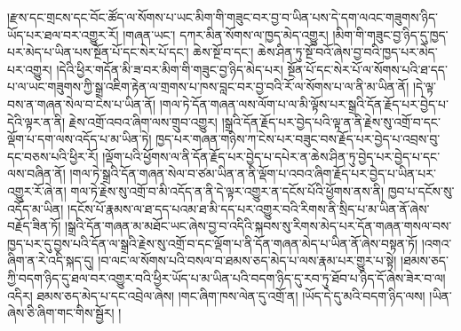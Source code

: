 །རྫས་དང་གྲངས་དང་བོང་ཚོད་ལ་སོགས་པ་ཡང་མིག་གི་གཟུང་བར་བྱ་བ་ཡིན་པས་དེ་དག་ལའང་གཟུགས་ཉིད་ཡོད་པར་ཐལ་བར་འགྱུར་རོ། །གཞན་ཡང་། དཀར་མིན་སོགས་ལ་ཁྱད་མེད་འགྱུར། །མིག་གི་གཟུང་བྱ་ཉིད་དུ་ཁྱད་པར་མེད་པ་ཡིན་པས་སྔོན་པོ་དང་སེར་པོ་དང་། ཆེས་སྔོ་བ་དང་། ཆེས་ཤིན་ཏུ་སྔོ་བའོ་ཞེས་བྱ་བའི་ཁྱད་པར་མེད་པར་འགྱུར། །དེའི་ཕྱིར་གདོན་མི་ཟ་བར་མིག་གི་གཟུང་བྱ་ཉིད་མེད་པར། སྔོན་པོ་དང་སེར་པོ་ལ་སོགས་པའི་ཐ་དད་པ་ལ་ཡང་གཟུགས་ཀྱི་སྒྲ་འཇིག་རྟེན་ལ་གྲགས་པ་ཁས་བླང་བར་བྱ་བའི་རོ་ལ་སོགས་པ་ལ་ནི་མ་ཡིན་ནོ། །དེ་ལྟ་བས་ན་གཞན་སེལ་བ་ངེས་པ་ཡིན་ནོ། །གལ་ཏེ་དོན་གཞན་ལས་ལོག་པ་ལ་མི་ལྟོས་པར་སྒྲའི་དོན་རྗོད་པར་བྱེད་པ་དེའི་ལྟར་ན་ནི། རྗེས་འགྲོ་འབའ་ཞིག་ལས་གྲུབ་འགྱུར། །སྒྲའི་དོན་རྗོད་པར་བྱེད་པའི་ལྟ་ན་ནི་རྗེས་སུ་འགྲོ་བ་དང་ལྡོག་པ་དག་ལས་འདོད་པ་མ་ཡིན་ཏེ། ཁྱད་པར་གཞན་གཉིས་ཀ་ངེས་པར་བཟུང་བས་རྗོད་པར་བྱེད་པ་འབྲས་བུ་དང་བཅས་པའི་ཕྱིར་རོ། །ལྡོག་པའི་ཕྱོགས་ལ་ནི་དོན་རྗོད་པར་བྱེད་པ་དཔེར་ན་ཆེས་ཤིན་ཏུ་བྱེད་པར་བྱེད་པ་དང་ལས་བཞིན་ནོ། །གལ་ཏེ་སྒྲའི་དོན་གཞན་སེལ་བ་ཙམ་ཡིན་ན་ནི་ལྡོག་པ་འབའ་ཞིག་རྗོད་པར་བྱེད་པ་ཡིན་པར་འགྱུར་རོ་ཞེ་ན། གལ་ཏེ་རྗེས་སུ་འགྲོ་བ་མི་འདོད་ན་ནི་དེ་ལྟར་འགྱུར་ན་དངོས་པོའི་ཕྱོགས་ནས་ནི། ཁྱབ་པ་དངོས་སུ་འདོད་མ་ཡིན། །དངོས་པོ་རྣམས་ལ་ཐ་དད་པའམ་ཐ་མི་དད་པར་འགྱུར་བའི་རིགས་ནི་སྲིད་པ་མ་ཡིན་ནོ་ཞེས་བརྗོད་ཟིན་ཏོ། །སྒྲའི་དོན་གཞན་མ་མཐོང་ཡང་ཞེས་བྱ་བ་འདིའི་སྐབས་སུ་རིགས་མེད་པར་དོན་གཞན་གསལ་བས་ཁྱད་པར་དུ་བྱས་པའི་དོན་ལ་སྒྲའི་རྗེས་སུ་འགྲོ་བ་དང་ལྡོག་པ་ནི་དོན་གཞན་མེད་པ་ཡིན་ནོ་ཞེས་བསྟན་ཏོ། །འགའ་ཞིག་ན་རེ་འདི་སྐད་དུ། །བ་ལང་ལ་སོགས་པའི་བསལ་བ་ཐམས་ཅད་མེད་པ་ལས་རྣམ་པར་གྱུར་པ་སྟེ། །ཐམས་ཅད་ཀྱི་བདག་ཉིད་དུ་ཐལ་བར་འགྱུར་བའི་ཕྱིར་ཡོད་པ་མ་ཡིན་པའི་བདག་ཉིད་དུ་རབ་ཏུ་ཐོབ་པ་ཉིད་དོ་ཞེས་ཟེར་བ་ལ། འདིར། ཐམས་ཅད་མེད་པ་དང་འབྲེལ་ཞེས། །གང་ཞིག་ཁས་ལེན་དུ་འགྲོ་ན། །ཡོད་དེ་དུ་མའི་བདག་ཉིད་ལས། །ཡིན་ཞེས་ཅི་ཞིག་གང་གིས་སྦྱོར། །
